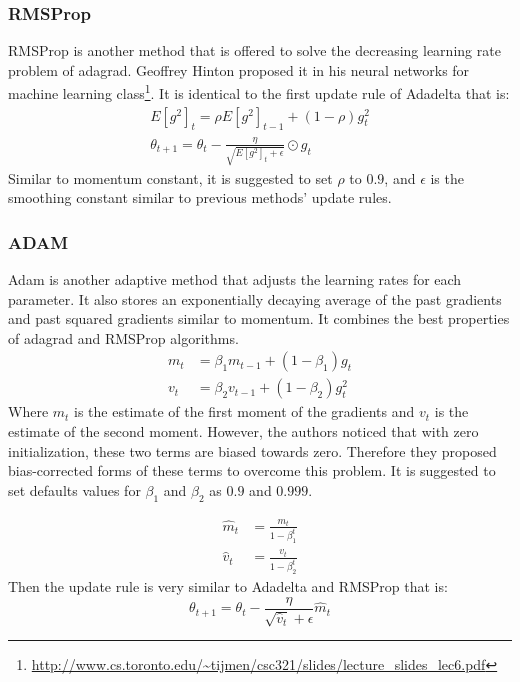 \documentclass[a4paper, nobind]{templates/ociamthesis}
\begin{document}
\hypertarget{rmsprop}{%
\subsubsection{RMSProp}\label{rmsprop}}

\noindent RMSProp is another method that is offered to solve the decreasing learning rate problem of adagrad. Geoffrey Hinton proposed it in his neural networks for machine learning class\footnote{\url{http://www.cs.toronto.edu/~tijmen/csc321/slides/lecture_slides_lec6.pdf}}. It is identical to the first update rule of Adadelta that is:
\[
\begin{aligned}
E\left[g^{2}\right]_{t}=\rho E\left[g^{2}\right]_{t-1}+(1-\rho) g_{t}^{2} \\
\theta_{t+1}=\theta_{t}-\frac{\eta}{\sqrt{E\left[g^{2}\right]_{t}+\epsilon}} \odot g_{t}
\end{aligned}
\]
Similar to momentum constant, it is suggested to set \(\rho\) to \(0.9\), and \(\epsilon\) is the smoothing constant similar to previous methods' update rules.

\hypertarget{adam}{%
\subsubsection{ADAM}\label{adam}}

\noindent Adam is another adaptive method that adjusts the learning rates for each parameter. It also stores an exponentially decaying average of the past gradients and past squared gradients similar to momentum. It combines the best properties of adagrad and RMSProp algorithms.
\[
\begin{aligned}
m_{t} &=\beta_{1} m_{t-1}+\left(1-\beta_{1}\right) g_{t} \\
v_{t} &=\beta_{2} v_{t-1}+\left(1-\beta_{2}\right) g_{t}^{2}
\end{aligned}
\]
Where \(m_t\) is the estimate of the first moment of the gradients and \(v_t\) is the estimate of the second moment. However, the authors noticed that with zero initialization, these two terms are biased towards zero. Therefore they proposed bias-corrected forms of these terms to overcome this problem. It is suggested to set defaults values for \(\beta_1\) and \(\beta_2\) as \(0.9\) and \(0.999\).

\[
\begin{aligned}
\hat{m}_{t} &=\frac{m_{t}}{1-\beta_{1}^{t}} \\
\hat{v}_{t} &=\frac{v_{t}}{1-\beta_{2}^{t}}
\end{aligned}
\]
Then the update rule is very similar to Adadelta and RMSProp that is:
\[
\theta_{t+1}=\theta_{t}-\frac{\eta}{\sqrt{\hat{v}_{t}}+\epsilon} \hat{m}_{t}
\]
\end{document}
